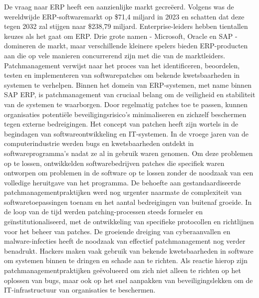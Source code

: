 De vraag naar ERP heeft een aanzienlijke markt gecreëerd. Volgens \textcite{Forbes2024} was de wereldwijde ERP-softwaremarkt op \$71,4 miljard in 2023 en schatten dat deze tegen 2032 zal stijgen naar \$238,79 miljard.
Enterprise-leiders hebben tientallen keuzes als het gaat om ERP. Drie grote namen - Microsoft, Oracle en SAP - domineren de markt, maar verschillende kleinere spelers bieden ERP-producten aan die op vele manieren concurrerend zijn met die van de marktleiders. \autocite{Pratt2023}
Patchmanagement verwijst naar het proces van het identificeren, beoordelen, testen en implementeren van softwarepatches om bekende kwetsbaarheden in systemen te verhelpen. 
Binnen het domein van ERP-systemen, met name binnen SAP ERP, is patchmanagement van cruciaal belang om de veiligheid en stabiliteit van de systemen te waarborgen. Door regelmatig patches toe te passen, kunnen organisaties potentiële beveiligingsrisico's minimaliseren en zichzelf beschermen tegen externe bedreigingen.
Het concept van patchen heeft zijn wortels in de begindagen van softwareontwikkeling en IT-systemen. In de vroege jaren van de computerindustrie werden bugs en kwetsbaarheden ontdekt in softwareprogramma's nadat ze al in gebruik waren genomen. Om deze problemen op te lossen, ontwikkelden softwarebedrijven patches die specifiek waren ontworpen om problemen in de software op te lossen zonder de noodzaak van een volledige heruitgave van het programma. \autocite{Buenning2024}
De behoefte aan gestandaardiseerde patchmanagementpraktijken werd nog urgenter naarmate de complexiteit van softwaretoepassingen toenam en het aantal bedreigingen van buitenaf groeide. In de loop van de tijd werden patching-processen steeds formeler en geïnstitutionaliseerd, met de ontwikkeling van specifieke protocollen en richtlijnen voor het beheer van patches. 
De groeiende dreiging van cyberaanvallen en malware-infecties heeft de noodzaak van effectief patchmanagement nog verder benadrukt. Hackers maken vaak gebruik van bekende kwetsbaarheden in software om systemen binnen te dringen en schade aan te richten. Als reactie hierop zijn patchmanagementpraktijken geëvolueerd om zich niet alleen te richten op het oplossen van bugs, maar ook op het snel aanpakken van beveiligingslekken om de IT-infrastructuur van organisaties te beschermen.

